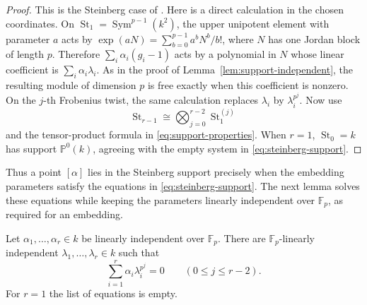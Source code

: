 \begin{proof}
This is the Steinberg case of
\cite[Proposition~4.2.5 and Corollary~4.2.7]{CoulembierFlakeSteinberg}.
Here is a direct calculation in the chosen coordinates.
On $\operatorname{St}_1=\operatorname{Sym}^{p-1}(k^2)$, the upper
unipotent element with parameter $a$ acts by
$\exp(aN)=\sum_{b=0}^{p-1}a^bN^b/b!$, where $N$ has one Jordan
block of length $p$.  Therefore $\sum_i\alpha_i(g_i-1)$ acts by a
polynomial in $N$ whose linear coefficient is
$\sum_i\alpha_i\lambda_i$.  As in the proof of
Lemma~\ref{lem:support-independent}, the resulting module of dimension
$p$ is free exactly when this coefficient is nonzero.
On the $j$-th Frobenius twist, the same calculation replaces
$\lambda_i$ by $\lambda_i^{p^j}$.
Now use
\[
 \operatorname{St}_{r-1}
 \cong\bigotimes_{j=0}^{r-2}\operatorname{St}_1^{(j)}
\]
and the tensor-product formula in \eqref{eq:support-properties}.
When $r=1$, $\operatorname{St}_0=k$ has support
$\mathbb P^0(k)$, agreeing with the empty system in
\eqref{eq:steinberg-support}.
\end{proof}

Thus a point $[\alpha]$ lies in the Steinberg support precisely when
the embedding parameters satisfy the equations in
\eqref{eq:steinberg-support}. The next lemma solves these equations
while keeping the parameters linearly independent over $\mathbb F_p$,
as required for an embedding.

\begin{lemma}\label{lem:moore-selection}
Let $\alpha_1,\ldots,\alpha_r\in k$ be linearly independent over
$\mathbb F_p$.  There are $\mathbb F_p$-linearly independent
$\lambda_1,\ldots,\lambda_r\in k$ such that
\begin{equation}\label{eq:selected-embedding}
 \sum_{i=1}^r\alpha_i\lambda_i^{p^j}=0
 \qquad(0\le j\le r-2).
\end{equation}
For $r=1$ the list of equations is empty.
\end{lemma}

